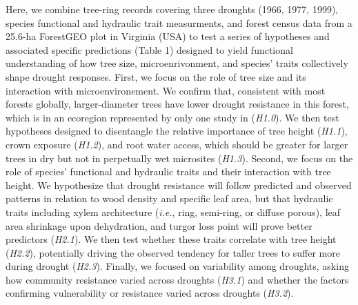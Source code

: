 \documentclass[]{article}
\begin{document}
Here, we combine tree-ring records covering three droughts (1966, 1977,
1999), species functional and hydraulic trait measurments, and forest
census data from a 25.6-ha ForestGEO plot in Virginia (USA) to test a
series of hypotheses and associated specific predictions (Table 1)
designed to yield functional understanding of how tree size,
microenrivonment, and species' traits collectively shape drought
responses. First, we focus on the role of tree size and its interaction
with microenvironement. We confirm that, consistent with most forests
globally, larger-diameter trees have lower drought resistance in this
forest, which is in an ecoregion represented by only one study in
\citep{bennett_larger_2015} (\emph{H1.0}). We then test hypotheses
designed to disentangle the relative importance of tree height
(\emph{H1.1}), crown exposure (\emph{H1.2}), and root water access,
which should be greater for larger trees in dry but not in perpetually
wet microsites (\emph{H1.3}). Second, we focus on the role of species'
functional and hydraulic traits and their interaction with tree height.
We hypothesize that drought resistance will follow predicted and
observed patterns in relation to wood density and specific leaf area,
but that hydraulic traits including xylem architecture (\emph{i.e.},
ring, semi-ring, or diffuse porous), leaf area shrinkage upon
dehydration, and turgor loss point will prove better predictors
(\emph{H2.1}). We then test whether these traits correlate with tree
height (\emph{H2.2}), potentially driving the observed tendency for
taller trees to suffer more during drought (\emph{H2.3}). Finally, we
focused on variability among droughts, asking how community resistance
varied across droughts (\emph{H3.1}) and whether the factors confirming
vulnerability or resistance varied across droughts (\emph{H3.2}).
\end{document}
